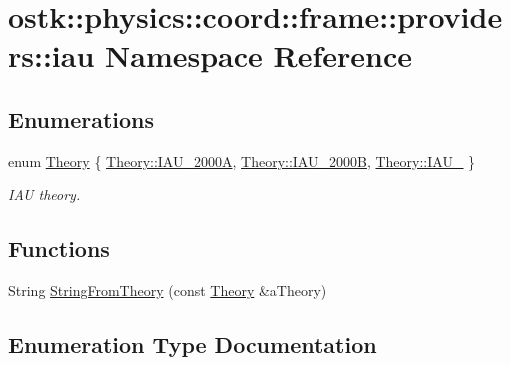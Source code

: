 \hypertarget{namespaceostk_1_1physics_1_1coord_1_1frame_1_1providers_1_1iau}{}\section{ostk\+:\+:physics\+:\+:coord\+:\+:frame\+:\+:providers\+:\+:iau Namespace Reference}
\label{namespaceostk_1_1physics_1_1coord_1_1frame_1_1providers_1_1iau}
\subsection*{Enumerations}
\begin{DoxyCompactItemize}
\item 
enum \hyperlink{namespaceostk_1_1physics_1_1coord_1_1frame_1_1providers_1_1iau_ae5e299153ae66dd034c8427dabfaff05}{Theory} \{ \hyperlink{namespaceostk_1_1physics_1_1coord_1_1frame_1_1providers_1_1iau_ae5e299153ae66dd034c8427dabfaff05a60f3efd7d208a933f2b423155cd9ebb1}{Theory\+::\+I\+A\+U\+\_\+2000A}, 
\hyperlink{namespaceostk_1_1physics_1_1coord_1_1frame_1_1providers_1_1iau_ae5e299153ae66dd034c8427dabfaff05adcf2f11e50df1fa8ddcd825264902a0b}{Theory\+::\+I\+A\+U\+\_\+2000B}, 
\hyperlink{namespaceostk_1_1physics_1_1coord_1_1frame_1_1providers_1_1iau_ae5e299153ae66dd034c8427dabfaff05ac0c7a91b74ed3a57a62b3df44c714ec5}{Theory\+::\+I\+A\+U\+\_}
 \}\begin{DoxyCompactList}\small\item\em I\+AU theory. \end{DoxyCompactList}
\end{DoxyCompactItemize}
\subsection*{Functions}
\begin{DoxyCompactItemize}
\item 
String \hyperlink{namespaceostk_1_1physics_1_1coord_1_1frame_1_1providers_1_1iau_a524fd2ca87a91eeb334015fdc2717920}{String\+From\+Theory} (const \hyperlink{namespaceostk_1_1physics_1_1coord_1_1frame_1_1providers_1_1iau_ae5e299153ae66dd034c8427dabfaff05}{Theory} \&a\+Theory)
\end{DoxyCompactItemize}


\subsection{Enumeration Type Documentation}
\mbox{\label{namespaceostk_1_1physics_1_1coord_1_1frame_1_1providers_1_1iau_ae5e299153ae66dd034c8427dabfaff05}} 
